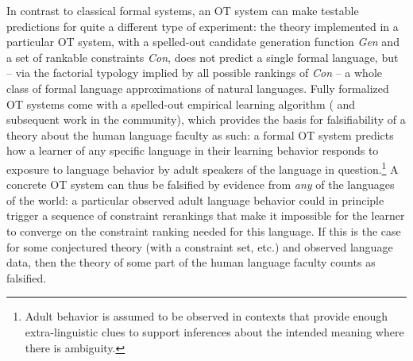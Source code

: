 \documentclass[output=paper,hidelinks]{langscibook}
\begin{document}
In contrast to classical formal systems, an OT system can make testable predictions for quite a different type of experiment: the theory implemented in a particular OT system, with a spelled-out candidate generation function \emph{Gen} and a set of rankable constraints \emph{Con}, does not predict a single formal language, but -- via the factorial typology implied by all possible rankings of \emph{Con} -- a whole class of formal language approximations of natural languages. Fully formalized OT systems come with a spelled-out empirical learning algorithm (\citealt{TesarSmolensky1998} and subsequent work in the community), which provides the basis for falsifiability of a theory about the human language faculty as such: %
a formal OT system predicts how a learner of any specific language in their learning behavior responds to exposure to language behavior by adult speakers of the language in question.\footnote{Adult behavior is assumed to be observed in contexts that provide enough extra-linguistic clues to support inferences about the intended meaning where there is ambiguity.} A concrete OT system can thus be falsified by evidence from \emph{any} of the languages of the world: a particular observed adult language behavior could in principle trigger a sequence of constraint rerankings that make it impossible for the learner to converge on the constraint ranking needed for this language. If this is the case for some conjectured theory (with a constraint set, etc.) and observed language data, then the theory of some part of the human language faculty counts as falsified.
\end{document}
